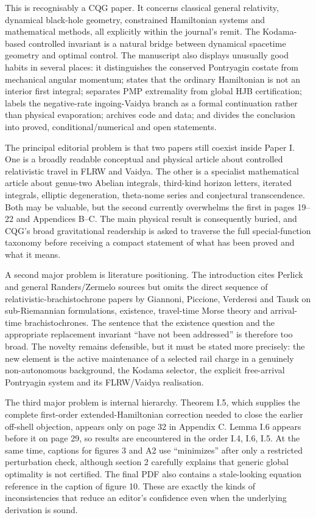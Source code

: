 \documentclass[11pt,a4paper]{article}
\begin{document}
This is recognisably a CQG paper.  It concerns classical general relativity, dynamical black-hole
geometry, constrained Hamiltonian systems and mathematical methods, all explicitly within the
journal's remit.  The Kodama-based controlled invariant is a natural bridge between dynamical
spacetime geometry and optimal control.  The manuscript also displays unusually good habits in
several places: it distinguishes the conserved Pontryagin costate from mechanical angular
momentum; states that the ordinary Hamiltonian is not an interior first integral; separates
PMP extremality from global HJB certification; labels the negative-rate ingoing-Vaidya branch as
a formal continuation rather than physical evaporation; archives code and data; and divides
the conclusion into proved, conditional/numerical and open statements.

The principal editorial problem is that two papers still coexist inside Paper I.  One is a
broadly readable conceptual and physical article about controlled relativistic travel in FLRW
and Vaidya.  The other is a specialist mathematical article about genus-two Abelian integrals,
third-kind horizon letters, iterated integrals, elliptic degeneration, theta-nome series and
conjectural transcendence.  Both may be valuable, but the second currently overwhelms the first
in pages 19--22 and Appendices B--C.  The main physical result is consequently buried, and CQG's
broad gravitational readership is asked to traverse the full special-function taxonomy before
receiving a compact statement of what has been proved and what it means.

A second major problem is literature positioning.  The introduction cites Perlick and general
Randers/Zermelo sources but omits the direct sequence of relativistic-brachistochrone papers by
Giannoni, Piccione, Verderesi and Tausk on sub-Riemannian formulations, existence, travel-time
Morse theory and arrival-time brachistochrones.  The sentence that the existence question and
the appropriate replacement invariant ``have not been addressed'' is therefore too broad.
The novelty remains defensible, but it must be stated more precisely: the new element is the
active maintenance of a selected rail charge in a genuinely non-autonomous background, the
Kodama selector, the explicit free-arrival Pontryagin system and its FLRW/Vaidya realisation.

The third major problem is internal hierarchy.  Theorem I.5, which supplies the complete
first-order extended-Hamiltonian correction needed to close the earlier off-shell objection,
appears only on page 32 in Appendix C.  Lemma I.6 appears before it on page 29, so results are
encountered in the order I.4, I.6, I.5.  At the same time, captions for figures 3 and A2 use
``minimizes'' after only a restricted perturbation check, although section 2 carefully explains
that generic global optimality is not certified.  The final PDF also contains a stale-looking
equation reference in the caption of figure 10.  These are exactly the kinds of inconsistencies
that reduce an editor's confidence even when the underlying derivation is sound.
\end{document}

